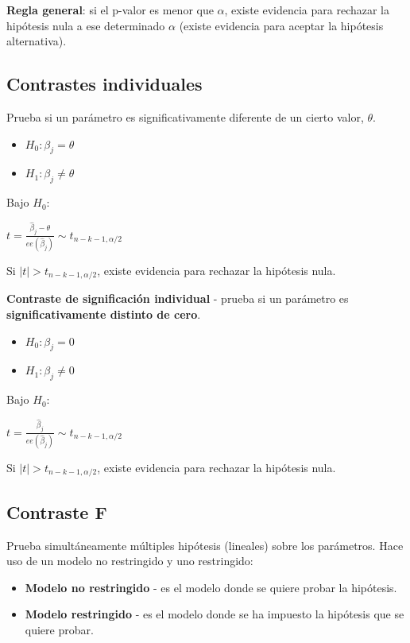 \documentclass[10pt, a4paper, landscape]{extarticle}
\begin{document}
\begin{multicols}{3}
\textbf{Regla general}: si el p-valor es menor que $\alpha$, existe evidencia para rechazar la hipótesis nula a ese determinado $\alpha$ (existe evidencia para aceptar la hipótesis alternativa).

\subsection*{Contrastes individuales}

Prueba si un parámetro es significativamente diferente de un cierto valor, $\theta$.

\begin{itemize}[leftmargin=*]
\item $H_0: \beta_j = \theta$
\item $H_1: \beta_j \neq \theta$
\end{itemize}

Bajo $H_0$:

\begin{center}
$t = \frac{\hat{\beta}_j - \theta}{ee(\hat{\beta}_j)} \sim t_{n-k-1, \alpha/2}$
\end{center}

Si $\mid t \mid > t_{n-k-1, \alpha/2}$, existe evidencia para rechazar la hipótesis nula.

\textbf{Contraste de significación individual} - prueba si un parámetro es \textbf{significativamente distinto de cero}.

\begin{itemize}[leftmargin=*]
\item $H_0: \beta_j = 0$
\item $H_1: \beta_j \neq 0$
\end{itemize}

Bajo $H_0$:

\begin{center}
$t = \frac{\hat{\beta}_j}{ee(\hat{\beta}_j)} \sim t_{n-k-1, \alpha/2}$
\end{center}

Si $\mid t \mid > t_{n-k-1, \alpha/2}$, existe evidencia para rechazar la hipótesis nula.

\subsection*{Contraste F}

Prueba simultáneamente múltiples hipótesis (lineales) sobre los parámetros. Hace uso de un modelo no restringido y uno restringido:

\begin{itemize}[leftmargin=*]
\item \textbf{Modelo no restringido} - es el modelo donde se quiere probar la hipótesis.
\item \textbf{Modelo restringido} - es el modelo donde se ha impuesto la hipótesis que se quiere probar.
\end{itemize}


\end{multicols}
\end{document}
